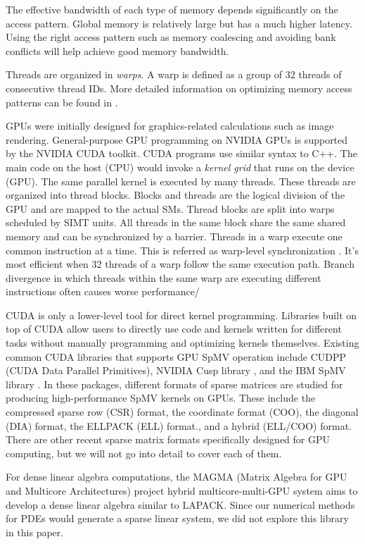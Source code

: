 The effective bandwidth of each type of memory depends significantly on the access pattern. Global memory is relatively large but has a much higher latency. Using the right access pattern such as memory coalescing and avoiding bank conflicts will help achieve good memory bandwidth.

Threads are organized in \textit{warps}. A warp is defined as a group of 32 threads of consecutive thread IDs. More detailed information on optimizing memory access patterns can be found in \cite{wilt2013cuda}.

GPUs were initially designed for graphics-related calculations such as image rendering. General-purpose GPU programming on NVIDIA GPUs is supported by the NVIDIA CUDA toolkit. CUDA programs use similar syntax to C++. The main code on the host (CPU) would invoke a \textit{kernel grid} that runs on the device (GPU). The same parallel kernel is executed by many threads. These threads are organized into thread blocks. Blocks and threads are the logical division of the GPU and are mapped to the actual SMs. Thread blocks are split into warps scheduled by SIMT units. All threads in the same block share the same shared memory and can be synchronized by a barrier. Threads in a warp execute one common instruction at a time. This is referred as warp-level synchronization \cite{wilt2013cuda}. It's most efficient when 32 threads of a warp follow the same execution path. Branch divergence in which threads within the same warp are executing different instructions often causes worse performance/

CUDA is only a lower-level tool for direct kernel programming. Libraries built on top of CUDA allow users to directly use code and kernels written for different tasks without manually programming and optimizing kernels themselves. Existing common CUDA libraries that supports GPU SpMV operation include CUDPP (CUDA Data Parallel Primitives)\cite{harris2007cudpp}, NVIDIA Cusp library \cite{dalton2014cusp}, and the IBM SpMV library \cite{baskaran2009optimizing}. In these packages, different formats of sparse matrices are studied for producing high-performance SpMV kernels on GPUs. These include the compressed sparse row (CSR) format, the coordinate format (COO), the diagonal (DIA) format, the ELLPACK (ELL) format., and a hybrid (ELL/COO) format. There are other recent sparse matrix formats specifically designed for GPU computing, but we will not go into detail to cover each of them.

For dense linear algebra computations, the MAGMA (Matrix Algebra for GPU and Multicore Architectures) project hybrid multicore-multi-GPU system aims to develop a dense linear algebra similar to LAPACK\cite{agullo2009numerical}. Since our numerical methods for PDEs would generate a sparse linear system, we did not explore this library in this paper.


